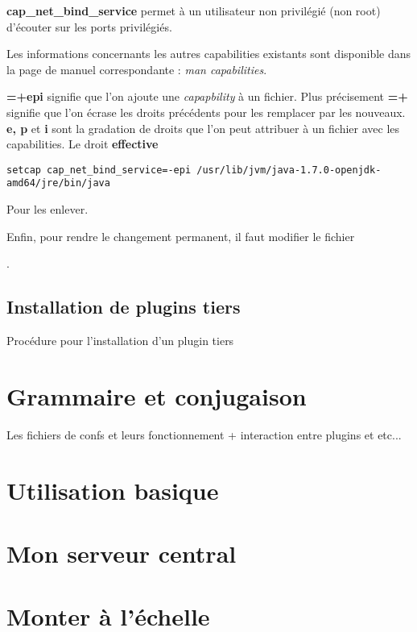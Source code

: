 \textbf{cap\_net\_bind\_service} permet à un utilisateur non privilégié (non root) 
d'écouter sur les ports privilégiés.

Les informations concernants les autres capabilities existants sont disponible dans
la page de manuel correspondante : \emph{man capabilities}.

\textbf{=+epi} signifie que l'on ajoute une \emph{capapbility} à un fichier. Plus 
précisement \textbf{=+} signifie que l'on écrase les droits précédents pour les remplacer
par les nouveaux. \textbf{e, p} et \textbf{i} sont la gradation de droits que l'on peut 
attribuer à un fichier avec les capabilities. Le droit \textbf{effective} 

\begin{lstlisting}[style=code,label={lst:unsetcapabilities}]
setcap cap_net_bind_service=-epi /usr/lib/jvm/java-1.7.0-openjdk-amd64/jre/bin/java
\end{lstlisting}
Pour les enlever.

Enfin, pour rendre le changement permanent, il faut modifier le fichier 

.

\subsection{Installation de plugins tiers}
Procédure pour l'installation d'un plugin tiers



\section{Grammaire et conjugaison}

Les fichiers de confs et leurs fonctionnement + interaction entre plugins et etc...



\section{Utilisation basique}

\section{Mon serveur central}



\section{Monter à l'échelle}




